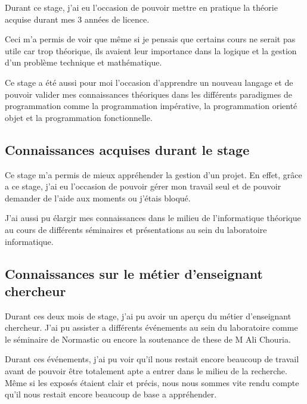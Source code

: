 Durant ce stage, j'ai eu l'occasion de pouvoir mettre en pratique la théorie acquise durant mes 3 années de licence.

Ceci m'a permis de voir que même si je pensais que certains cours ne serait pas utile car trop théorique, ils avaient leur importance dans la logique et la gestion d'un problème technique et mathématique.

Ce stage a été aussi pour moi l'occasion d'apprendre un nouveau langage et de pouvoir valider mes connaissances théoriques dans les différents paradigmes de programmation comme la programmation impérative, la programmation orienté objet et la programmation fonctionnelle.

\subsection{Connaissances acquises durant le stage}    
\label{sub:Connaissances acquises durant le stage}
  
Ce stage m'a permis de mieux appréhender la gestion d'un projet. En effet, grâce a ce stage, j'ai eu l'occasion de pouvoir gérer mon travail seul et de pouvoir demander de l'aide aux moments ou j’étais bloqué.

J'ai aussi pu élargir mes connaissances dans le milieu de l'informatique théorique au cours de différents séminaires et présentations au sein du laboratoire informatique.

\subsection{Connaissances sur le m\'etier d'enseignant chercheur} 
\label{sub:Connaissances sur le m\'etier d'enseignant chercheur}

Durant ces deux mois de stage, j'ai pu avoir un aperçu du métier d'enseignant chercheur. J'ai pu assister a différents événements au sein du laboratoire comme le séminaire de Normastic ou encore la soutenance de these de M Ali Chouria.

Durant ces événements, j'ai pu voir qu'il nous restait encore beaucoup de travail avant de pouvoir être totalement apte a entrer dans le milieu de la recherche. Même si les exposés étaient  clair et précis, nous nous sommes vite rendu compte qu'il nous restait encore beaucoup de base a appréhender.

